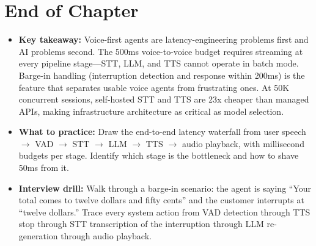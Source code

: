 \section*{End of Chapter}
\begin{itemize}
  \item \textbf{Key takeaway:} Voice-first agents are latency-engineering problems first and AI problems second. The 500ms voice-to-voice budget requires streaming at every pipeline stage---STT, LLM, and TTS cannot operate in batch mode. Barge-in handling (interruption detection and response within 200ms) is the feature that separates usable voice agents from frustrating ones. At 50K concurrent sessions, self-hosted STT and TTS are 23x cheaper than managed APIs, making infrastructure architecture as critical as model selection.
  \item \textbf{What to practice:} Draw the end-to-end latency waterfall from user speech $\rightarrow$ VAD $\rightarrow$ STT $\rightarrow$ LLM $\rightarrow$ TTS $\rightarrow$ audio playback, with millisecond budgets per stage. Identify which stage is the bottleneck and how to shave 50ms from it.
  \item \textbf{Interview drill:} Walk through a barge-in scenario: the agent is saying ``Your total comes to twelve dollars and fifty cents'' and the customer interrupts at ``twelve dollars.'' Trace every system action from VAD detection through TTS stop through STT transcription of the interruption through LLM re-generation through audio playback.
\end{itemize}
